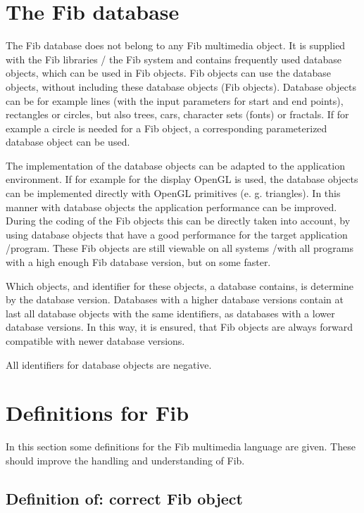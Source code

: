 

\section{The Fib database}
\label{secFibDatabase}

The Fib database does not belong to any Fib multimedia object. It is supplied with the Fib libraries / the Fib system and contains frequently used database objects, which can be used in Fib objects. Fib objects can use the database objects, without including these database objects (Fib objects). Database objects can be for example lines (with the input parameters for start and end points), rectangles or circles, but also trees, cars, character sets (fonts) or fractals. If for example a circle is needed for a Fib object, a corresponding parameterized database object can be used.

The implementation of the database objects can be adapted to the application environment. If for example for the display OpenGL is used, the database objects can be implemented directly with OpenGL primitives (e. g. triangles). In this manner with database objects the application performance can be improved. During the coding of the Fib objects this can be directly taken into account, by using database objects that have a good performance for the target application /program. These Fib objects are still viewable on all systems /with all programs with a high enough Fib database version, but on some faster.

Which objects, and identifier for these objects, a database contains, is determine by the database version. Databases with a higher database versions contain at last all database objects with the same identifiers, as databases with a lower database versions. In this way, it is ensured, that Fib objects are always forward compatible with newer database versions.

All identifiers for database objects are negative.




\section{Definitions for Fib}
\label{secDefinitionsForFib}

In this section some definitions for the Fib multimedia language are given. These should improve the handling and understanding of Fib.


\subsection{Definition of: correct Fib object}


